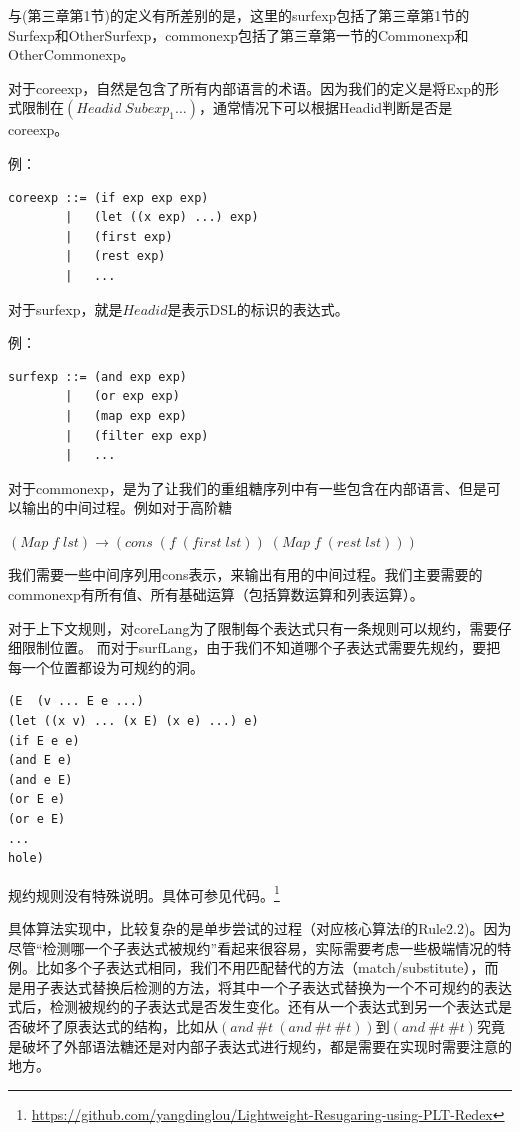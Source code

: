 与(第三章第1节)的定义有所差别的是，这里的surfexp包括了第三章第1节的Surfexp和OtherSurfexp，commonexp包括了第三章第一节的Commonexp和OtherCommonexp。

对于coreexp，自然是包含了所有内部语言的术语。因为我们的定义是将Exp的形式限制在$(Headid\;Subexp_{1}\ldots)$，通常情况下可以根据Headid判断是否是coreexp。

例：
\begin{verbatim}
coreexp ::= (if exp exp exp)
        |   (let ((x exp) ...) exp)
        |   (first exp)
        |   (rest exp)
        |   ...
\end{verbatim}

对于surfexp，就是$Headid$是表示DSL的标识的表达式。

例：
\begin{verbatim}
surfexp ::= (and exp exp)
        |   (or exp exp)
        |   (map exp exp)
        |   (filter exp exp)
        |   ...
\end{verbatim}

对于commonexp，是为了让我们的重组糖序列中有一些包含在内部语言、但是可以输出的中间过程。例如对于高阶糖

$(Map\;f\;lst)→(cons\;(f\;(first\;lst))\;(Map\;f\;(rest\;lst)))$

\begin{flushleft}
	我们需要一些中间序列用cons表示，来输出有用的中间过程。我们主要需要的commonexp有所有值、所有基础运算（包括算数运算和列表运算）。
\end{flushleft}

对于上下文规则，对coreLang为了限制每个表达式只有一条规则可以规约，需要仔细限制位置。
而对于surfLang，由于我们不知道哪个子表达式需要先规约，要把每一个位置都设为可规约的洞。
\begin{verbatim}
(E  (v ... E e ...)
(let ((x v) ... (x E) (x e) ...) e)
(if E e e)
(and E e)
(and e E)
(or E e)
(or e E)
...
hole)
\end{verbatim}

规约规则没有特殊说明。具体可参见代码。\footnote{\url{https://github.com/yangdinglou/Lightweight-Resugaring-using-PLT-Redex}}

具体算法实现中，比较复杂的是单步尝试的过程（对应核心算法f的Rule2.2)。因为尽管“检测哪一个子表达式被规约”看起来很容易，实际需要考虑一些极端情况的特例。比如多个子表达式相同，我们不用匹配替代的方法（match/substitute），而是用子表达式替换后检测的方法，将其中一个子表达式替换为一个不可规约的表达式后，检测被规约的子表达式是否发生变化。还有从一个表达式到另一个表达式是否破坏了原表达式的结构，比如从$(and~\#t~(and~\#t~\#t))$到$(and~\#t~\#t)$究竟是破坏了外部语法糖还是对内部子表达式进行规约，都是需要在实现时需要注意的地方。